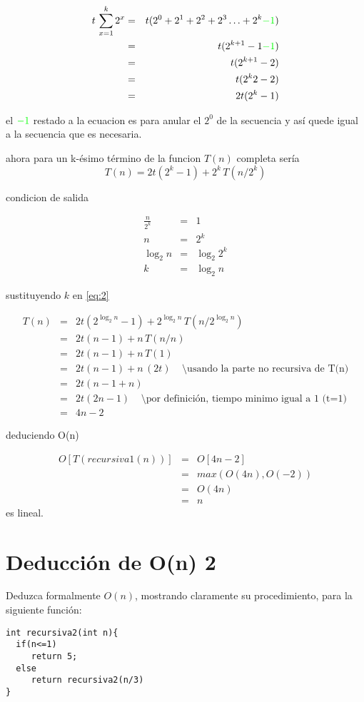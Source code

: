 \begin{eqnarray*}
  t\,\sum_{x=1}^k2^x&=&t(2^0+2^1+2^2 + 2^3 \ldots +2^k \textcolor{green}{-1})\\
  &=&t(2^{k+1}-1 \textcolor{green}{-1})\\
  &=&t(2^{k+1}-2)\\
  &=&t(2^k2-2)\\
  &=&2t(2^k-1)
\end{eqnarray*}

el $\textcolor{green}{-1}$ restado a la ecuacion es para anular el $2^0$ de la secuencia
y así quede igual a la secuencia que es necesaria.

ahora para un k-ésimo término de la funcion $T(n)$ completa sería
\begin{equation}
  \label{eq:2}
  T(n)=2t(2^k-1)+2^k\,T(n/2^k)
\end{equation}

condicion de salida

\begin{eqnarray*}
  \label{eq:3}
  \frac{n}{2^k}&=&1\\
  n&=&2^k\\
  \log_{2}n&=&\log_{2}2^k\\
  k&=&\log_{2}n
\end{eqnarray*}

sustituyendo $k$ en \ref{eq:2} 

\begin{eqnarray*}
  T(n)&=&2t(2^{\log_{2}n}-1)+2^{\log_{2}n}\,T(n/2^{\log_{2}n})\\
  &=&2t(n-1)+n\,T(n/n)\\
  &=&2t(n-1)+n\,T(1)\\
  &=&2t(n-1)+n\,(2t) \;\;\;\;  \setminus \text{usando la parte no recursiva de T(n)}\\
  &=&2t(n-1+n)\\
  &=&2t(2n-1) \;\;\;\;  \setminus \text{por definición, tiempo minimo igual a 1 (t=1)}\\
  &=&4n-2
\end{eqnarray*}

deduciendo O(n)

\begin{eqnarray*}
  O[T(recursiva1(n))]&=&O[4n-2]\\
  &=&max(O(4n), O(-2))\\
  &=&O(4n)\\
  &=&n
\end{eqnarray*}
es lineal.

\section{Deducción de O(n) 2}
Deduzca formalmente $O(n)$, mostrando claramente su procedimiento,
para la siguiente función:
\begin{lstlisting}[style=miEstilo, numbers=none]
int recursiva2(int n){
  if(n<=1)
     return 5;
  else
     return recursiva2(n/3)
}
\end{lstlisting}


